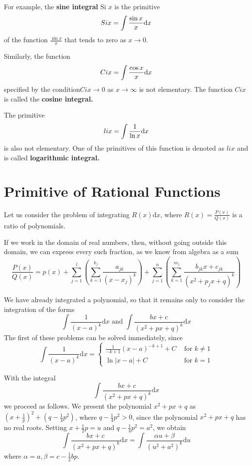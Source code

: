\documentclass[a4paper,12pt]{article} %
\begin{document}
For example, the \textbf{sine integral} Si $x$ is the primitive
\[
    \normalfont
   Si x =  \int \frac{\sin x}{x} \mathrm{d}x
    \]
 of the function $\frac{\sin x}{x}$ that tends to zero as 
$x \to 0$.

Similarly, the function 
\[
    \normalfont
    Ci x = \int \frac{\cos x}{x} \mathrm{d}x
    \]
specified by the condition$ Ci x \to 0$ as $ x \to \infty$ is not elementary.
The function $Ci x$ is called the \textbf{cosine integral.}

The primitive 
\[
    \normalfont 
   li x =  \int \frac{1}{\ln x}\mathrm{d}x
   \]
   is also not elementary. One of the primitives of this function 
   is denoted as $li x$ and is called \textbf{logarithmic integral.}

\section{Primitive of Rational Functions}
Let us consider the problem of integrating $R(x)\mathrm{d}x$, where 
$R(x) = \frac{P(x)}{Q(x)}$ is a ratio of polynomials.

If we work in the domain of real numbers, then, without going outside 
this domain, we can express every such fraction, as we know from 
algebra as a sum 
\begin{equation}
    \frac{P(x)}{Q(x)} = p(x) + \sum_{j=1}^l \left(\sum_{k=1}^{k_j} \frac{a_{jk}}{(x - x_j)^k}\right)
    + \sum_{j=1}^n\left(\sum_{k=1}^{m_j}\frac{b_{jk}x + c_{jk}}{(x^2 + p_jx + q)^k}\right)
\end{equation}

We have already integrated a polynomial, so that it remains only 
to consider the integration of the forms
\[
    \int\frac{1}{(x-a)^k}\mathrm{d}x  \text{ and } \int \frac{bx + c}{(x^2 + px + q)^k}\mathrm{d}x
    \]
The first of these problems can be solved immediately, since 
\begin{equation}
    \int \frac{1}{(x-a)^k}\mathrm{d}x = \left\{\begin{array}{cl}\frac{1}{-k+1}
        (x-a)^{-k+1}+C & \text{ for } k \ne 1 \\
        \ln \vert x-a \vert +C & \text{ for } k = 1 
    \end{array} \right.
\end{equation}

With the integral 
\[
    \int \frac{bx+c}{(x^2+px+q)^k}\mathrm{d}x
    \]
we proceed as follows. We present the polynomial $x^2+px+q$ as $\left(x+\frac{1}{p}\right)^2
 + \left(q - \frac{1}{4}p^2\right)$, where $q - \frac{1}{4}p^2 > 0$, since the polynomial 
 $x^2+px+q$ has no real roots. Setting $x + \frac{1}{2}p = u$ and $q - \frac{1}{4}p^2
 = a^2$, we obtain 
\[
    \int \frac{bx + c}{(x^2 + px + q)^k}\mathrm{d}x = 
    \int \frac{\alpha u + \beta}{(u^2 + a^2)^k}\mathrm{d}u
    \]
where $\alpha = a, \beta = c - \frac{1}{2}bp.$
\end{document}

